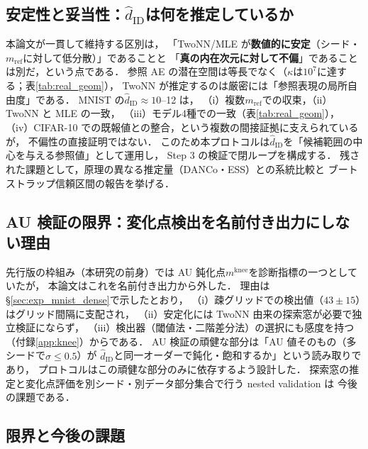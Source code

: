\documentclass[11pt,a4paper]{jsarticle}
\newcommand{\hatdID}{\hat{d}_{\mathrm{ID}}}
\newcommand{\kap}{\kappa}
\newcommand{\mknee}{m^{\mathrm{knee}}}
\begin{document}
\subsection{安定性と妥当性：$\hatdID$は何を推定しているか}\label{sec:disc_twonn}

本論文が一貫して維持する区別は，
「TwoNN/MLE が\textbf{数値的に安定}（シード・$m_{\mathrm{ref}}$に対して低分散）」であることと
「\textbf{真の内在次元に対して不偏}」であることは別だ，という点である．
参照 AE の潜在空間は等長でなく（$\kap$は$10^{7}$に達する；表\ref{tab:real_geom}），
TwoNN が推定するのは厳密には「参照表現の局所自由度」である．
MNIST の$\hatdID \approx 10$--12 は，
（i）複数$m_{\mathrm{ref}}$での収束，（ii）TwoNN と MLE の一致，
（iii）モデル4種での一致（表\ref{tab:real_geom}），
（iv）CIFAR-10 での既報値との整合，という複数の間接証拠に支えられているが，
不偏性の直接証明ではない．
このため本プロトコルは$\hatdID$を「候補範囲の中心を与える参照値」として運用し，
Step 3 の検証で閉ループを構成する．
残された課題として，原理の異なる推定量（DANCo\cite{ceruti2014danco}・ESS）との系統比較と
ブートストラップ信頼区間の報告を挙げる．

\subsection{AU 検証の限界：変化点検出を名前付き出力にしない理由}\label{sec:disc_knee}

先行版の枠組み（本研究の前身）では AU 鈍化点$\mknee$を診断指標の一つとしていたが，
本論文はこれを名前付き出力から外した．
理由は§\ref{sec:exp_mnist_dense}で示したとおり，
（i）疎グリッドでの検出値（$43 \pm 15$）はグリッド間隔に支配され，
（ii）安定化には TwoNN 由来の探索窓が必要で独立検証にならず，
（iii）検出器（閾値法・二階差分法）の選択にも感度を持つ（付録\ref{app:knee}）からである．
AU 検証の頑健な部分は「AU 値そのもの（多シードで$\sigma \leq 0.5$）が
$\hatdID$と同一オーダーで鈍化・飽和するか」という読み取りであり，
プロトコルはこの頑健な部分のみに依存するよう設計した．
探索窓の推定と変化点評価を別シード・別データ部分集合で行う nested validation は
今後の課題である．

\subsection{限界と今後の課題}\label{sec:disc_limitation}
\end{document}
